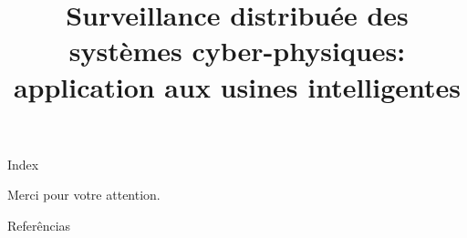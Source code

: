 \documentclass[ieee,english]{slides}
\title{Surveillance distribuée des systèmes cyber-physiques:\\application aux usines intelligentes}
\begin{document}
\maketitle{}

\begin{slide}{Index}
  \begin{minipage}[t][0.4\textheight][t]{0.45\textwidth}
    \tableofcontents[sections={1-4}]
  \end{minipage}
  \begin{minipage}[t][0.4\baselineskip][t]{0.45\textwidth}
    \tableofcontents[sections={5-}]
  \end{minipage}
  \vfill\null{}
\end{slide}















\begin{slide}{}
  \vspace*{\fill}
  \begin{center}
    \textcolor{fg}{\Large{Merci pour votre attention.}}
  \end{center}
  \vspace*{\fill}
\end{slide}

\begin{slide}[allowframebreaks]{Referências}
  \nocite{*}
  \printbibliography{}
\end{slide}
\end{document}
